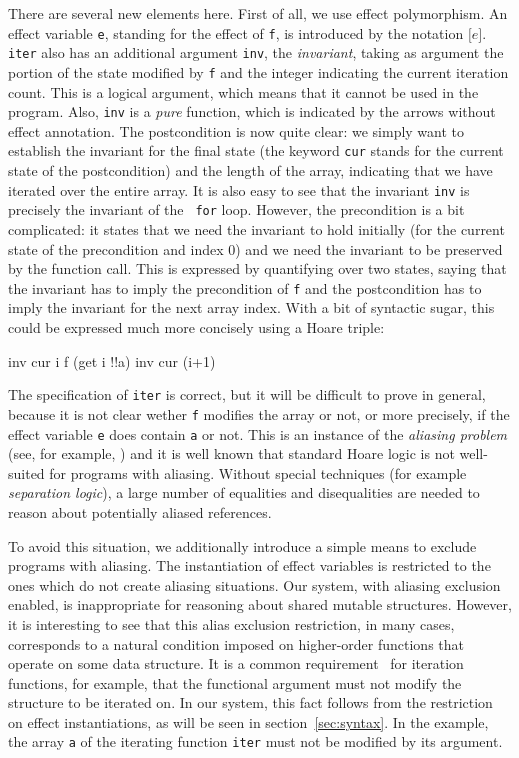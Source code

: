 \documentclass[a4paper]{llncs}
\begin{document}
There are several new elements here. First of all, we use effect polymorphism.
An effect variable {\tt e}, standing for the effect of {\tt f}, is introduced
by the notation ${\mathtt [e]}$.  {\tt iter} also has an additional argument
{\tt inv}, the {\em invariant}, taking as argument the portion of the state
modified by {\tt f} and the integer indicating the current iteration count.
This is a logical argument, which means that it cannot be used in the program.
Also, {\tt inv} is a {\em pure} function, which is indicated by the arrows
without effect annotation. The postcondition is now quite clear: we simply
want to establish the invariant for the final state (the keyword {\tt cur}
stands for the current state of the postcondition) and the length of the
array, indicating that we have iterated over the entire array. It is also easy
to see that the invariant {\tt inv} is precisely the invariant of the {\tt
for} loop.  However, the precondition is a bit complicated: it states that we
need the invariant to hold initially (for the current state of the
precondition and index $0$) and we need the invariant to be preserved by the
function call.  This is expressed by quantifying over two states, saying that
the invariant has to imply the precondition of {\tt f} and the postcondition
has to imply the invariant for the next array index.  With a bit of syntactic
sugar, this could be expressed much more concisely using a Hoare triple:
\begin{who} 
  { inv cur i } f (get i !!a) { inv cur (i+1) } 
\end{who}

The specification of {\tt iter} is correct, but it will be difficult to prove
in general, because it is not clear wether {\tt f} modifies the array or not,
or more precisely, if the effect variable {\tt e} does contain {\tt a} or not.
This is an instance of the {\em aliasing problem} (see, for
example, \cite{reynolds78popl}) and it is well known that standard Hoare logic
is not well-suited for programs with aliasing. Without special techniques (for
example {\em separation logic}), a large number of equalities and disequalities
are needed to reason about potentially aliased references. 

To avoid this situation, we additionally introduce a simple means to exclude
programs with aliasing. The instantiation of effect variables is restricted to
the ones which do not create aliasing situations. Our system, with aliasing
exclusion enabled, is inappropriate for reasoning about shared mutable
structures. However, it is interesting to see that this alias exclusion
restriction, in many cases, corresponds to a natural condition imposed on
higher-order functions that operate on some data structure. It is a common
requirement~\cite{Nanevski08Awkward,Krishnaswami06} for iteration functions,
for example, that the functional argument must not modify the structure to be
iterated on. In our system, this fact follows from the restriction on effect
instantiations, as will be seen in section~\ref{sec:syntax}. In the example,
the array {\tt a} of the iterating function {\tt iter} must not be modified by
its argument.
\end{document}
